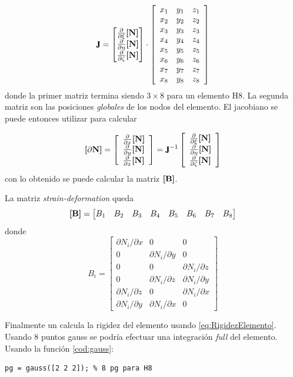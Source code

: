 \begin{equation}
\jac = \begin{bmatrix}
\frac{\partial}{\partial \xi} \MN \\
\frac{\partial}{\partial \eta} \MN \\
\frac{\partial}{\partial \zeta} \MN 
\end{bmatrix}
\cdot 
\left[\begin{array}{lll}{x_{1}} & {y_{1}} & {z_{1}} \\ {x_{2}} & {y_{2}} & {z_{2}} \\ {x_{3}} & {y_{3}} & {z_{3}} \\ {x_{4}} & {y_{4}} & {z_{4}} \\ {x_{5}} & {y_{5}} & {z_{5}} \\ {x_{6}} & {y_{6}} & {z_{6}} \\ {x_{7}} & {y_{7}} & {z_{7}} \\ {x_{8}} & {y_{8}} & {z_{8}}\end{array}\right]
\end{equation}
donde la primer matriz termina siendo $3\times8$ para un elemento H8. La segunda matriz son las posiciones \textit{globales} de los nodos del elemento. El jacobiano se puede entonces utilizar para calcular

\begin{equation}
\Mme{\partial N}=\left[\begin{array}{l} \frac{\partial}{\partial x}\MN  \\ \frac{\partial}{\partial y} \MN  \\ \frac{\partial}{\partial z} \MN  \end{array}\right]=\jac^{-1}\left[\begin{array}{l}\frac{\partial}{\partial \xi} \MN \\
\frac{\partial}{\partial \eta} \MN \\ 
\frac{\partial}{\partial \zeta} \MN \end{array}\right]
\end{equation}
con lo obtenido se puede calcular la matriz $\boldsymbol{[}\mathbf{B} \boldsymbol{]}$.

La matriz \textit{strain-deformation} queda
\[
\boldsymbol{[}\mathbf{B} \boldsymbol{]} = \begin{bmatrix}
B_1 &B_2 &B_3 &B_4 &B_5 &B_6 &B_7 &B_8
\end{bmatrix}
\]
donde
\begin{equation}
B_{i}=\left[\begin{array}{ccc}{\partial N_{i} / \partial x} & {0} & {0} \\ {0} & {\partial N_{i} / \partial y} & {0} \\ {0} & {0} & {\partial N_{i} / \partial z} \\ {0} & {\partial N_{i} / \partial z} & {\partial N_{i} / \partial y} \\ {\partial N_{i} / \partial z} & {0} & {\partial N_{i} / \partial x} \\ {\partial N_{i} / \partial y} & {\partial N_{i} / \partial x} & {0}\end{array}\right]
\end{equation}

Finalmente un calcula la rigidez del elemento usando \eqref{eq:RigidezElemento}. Usando 8 puntos gauss se podría efectuar una integración \textit{full} del elemento. Usando la función \ref{cod:gauss}:
\begin{lstlisting}
pg = gauss([2 2 2]); % 8 pg para H8 
\end{lstlisting}


